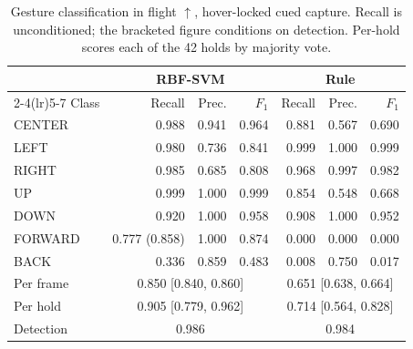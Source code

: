 \begin{table}[t]
\caption{Gesture classification in flight $\uparrow$, hover-locked cued capture. Recall is unconditioned; the bracketed figure conditions on detection. Per-hold scores each of the 42 holds by majority vote.}
\label{tab:inflight}
\centering
\footnotesize
\setlength{\tabcolsep}{3pt}
\renewcommand{\arraystretch}{1.02}
\begin{tabular}{@{}lrrrrrr@{}}
\toprule
& \multicolumn{3}{c}{RBF-SVM} & \multicolumn{3}{c}{Rule} \\
\cmidrule(lr){2-4}\cmidrule(lr){5-7}
Class & Recall & Prec. & $F_1$ & Recall & Prec. & $F_1$ \\
\midrule
CENTER & 0.988 & 0.941 & 0.964 & 0.881 & 0.567 & 0.690 \\
LEFT & 0.980 & 0.736 & 0.841 & 0.999 & 1.000 & 0.999 \\
RIGHT & 0.985 & 0.685 & 0.808 & 0.968 & 0.997 & 0.982 \\
UP & 0.999 & 1.000 & 0.999 & 0.854 & 0.548 & 0.668 \\
DOWN & 0.920 & 1.000 & 0.958 & 0.908 & 1.000 & 0.952 \\
FORWARD & 0.777 (0.858) & 1.000 & 0.874 & 0.000 & 0.000 & 0.000 \\
BACK & 0.336 & 0.859 & 0.483 & 0.008 & 0.750 & 0.017 \\
\midrule
Per frame & \multicolumn{3}{c}{0.850 [0.840, 0.860]} & \multicolumn{3}{c}{0.651 [0.638, 0.664]} \\
Per hold & \multicolumn{3}{c}{0.905 [0.779, 0.962]} & \multicolumn{3}{c}{0.714 [0.564, 0.828]} \\
Detection & \multicolumn{3}{c}{0.986} & \multicolumn{3}{c}{0.984} \\
\bottomrule
\end{tabular}
\end{table}
